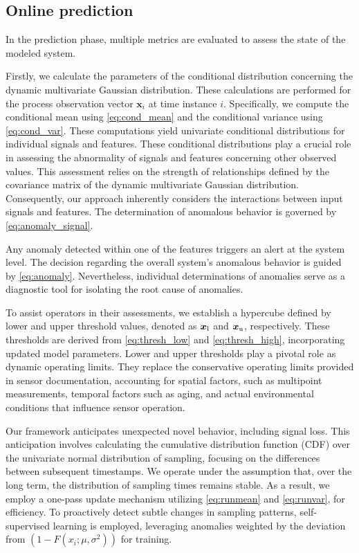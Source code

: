 \subsection{Online prediction}\label{predict}
In the prediction phase, multiple metrics are evaluated to assess the state of the modeled system.

Firstly, we calculate the parameters of the conditional distribution concerning the dynamic multivariate Gaussian distribution. These calculations are performed for the process observation vector $\boldsymbol{x}_i$ at time instance $i$. Specifically, we compute the conditional mean using \eqref{eq:cond_mean} and the conditional variance using \eqref{eq:cond_var}. These computations yield univariate conditional distributions for individual signals and features. These conditional distributions play a crucial role in assessing the abnormality of signals and features concerning other observed values. This assessment relies on the strength of relationships defined by the covariance matrix of the dynamic multivariate Gaussian distribution. Consequently, our approach inherently considers the interactions between input signals and features. The determination of anomalous behavior is governed by \eqref{eq:anomaly_signal}.

Any anomaly detected within one of the features triggers an alert at the system level. The decision regarding the overall system's anomalous behavior is guided by \eqref{eq:anomaly}. Nevertheless, individual determinations of anomalies serve as a diagnostic tool for isolating the root cause of anomalies.

To assist operators in their assessments, we establish a hypercube defined by lower and upper threshold values, denoted as $\boldsymbol{x} _{\text{l}}$ and $\boldsymbol{x} _{\text{u}}$, respectively. These thresholds are derived from \eqref{eq:thresh_low} and \eqref{eq:thresh_high}, incorporating updated model parameters. Lower and upper thresholds play a pivotal role as dynamic operating limits. They replace the conservative operating limits provided in sensor documentation, accounting for spatial factors, such as multipoint measurements, temporal factors such as aging, and actual environmental conditions that influence sensor operation.

Our framework anticipates unexpected novel behavior, including signal loss. This anticipation involves calculating the cumulative distribution function (CDF) over the univariate normal distribution of sampling, focusing on the differences between subsequent timestamps. We operate under the assumption that, over the long term, the distribution of sampling times remains stable. As a result, we employ a one-pass update mechanism utilizing \eqref{eq:runmean} and \eqref{eq:runvar}, for efficiency. To proactively detect subtle changes in sampling patterns, self-supervised learning is employed, leveraging anomalies weighted by the deviation from $(1 - F(x_i; \mu, \sigma^2))$ for training.

